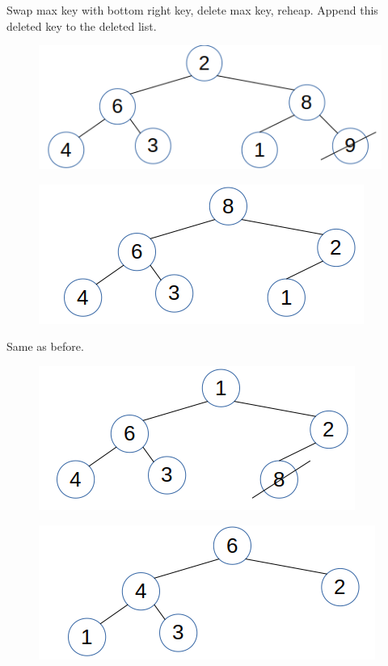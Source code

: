 \documentclass{article}
\begin{document}
Swap max key with bottom right key, delete max key, reheap. Append this deleted key to the deleted list. 

\begin{figure}[H]
\includegraphics[scale=0.5]{./P16/r9}
\centering
\end{figure}

\begin{figure}[H]
\includegraphics[scale=0.5]{./P16/m8}
\centering
\end{figure}

Same as before. 

\begin{figure}[H]
\includegraphics[scale=0.5]{./P16/r8}
\centering
\end{figure}

\begin{figure}[H]
\includegraphics[scale=0.5]{./P16/m6}
\centering
\end{figure}
\end{document}
